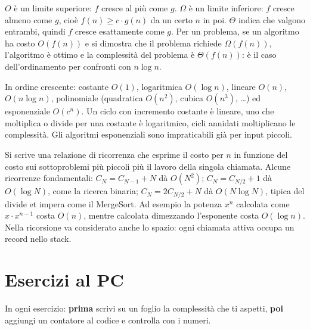 \begin{orale}
$O$ è un limite superiore: $f$ cresce al più come $g$. $\Omega$ è un limite inferiore:
$f$ cresce almeno come $g$, cioè $f(n) \ge c \cdot g(n)$ da un certo $n$ in poi.
$\Theta$ indica che valgono entrambi, quindi $f$ cresce esattamente come $g$. Per un
problema, se un algoritmo ha costo $O(f(n))$ e si dimostra che il problema richiede
$\Omega(f(n))$, l'algoritmo è ottimo e la complessità del problema è $\Theta(f(n))$:
è il caso dell'ordinamento per confronti con $n \log n$.
\end{orale}

\begin{orale}
In ordine crescente: costante $O(1)$, logaritmica $O(\log n)$, lineare $O(n)$,
$O(n \log n)$, polinomiale (quadratica $O(n^2)$, cubica $O(n^3)$, \ldots) ed
esponenziale $O(c^n)$. Un ciclo con incremento costante è lineare, uno che
moltiplica o divide per una costante è logaritmico, cicli annidati moltiplicano le
complessità. Gli algoritmi esponenziali sono impraticabili già per input piccoli.
\end{orale}

\begin{orale}
Si scrive una relazione di ricorrenza che esprime il costo per $n$ in funzione del
costo sui sottoproblemi più piccoli più il lavoro della singola chiamata. Alcune
ricorrenze fondamentali: $C_N = C_{N-1} + N$ dà $O(N^2)$; $C_N = C_{N/2} + 1$ dà
$O(\log N)$, come la ricerca binaria; $C_N = 2C_{N/2} + N$ dà $O(N \log N)$, tipica
del divide et impera come il MergeSort. Ad esempio la potenza $x^n$ calcolata come
$x \cdot x^{n-1}$ costa $O(n)$, mentre calcolata dimezzando l'esponente costa
$O(\log n)$. Nella ricorsione va considerato anche lo spazio: ogni chiamata attiva
occupa un record nello stack.
\end{orale}

\section{Esercizi al PC}

In ogni esercizio: \textbf{prima} scrivi su un foglio la complessità che ti
aspetti, \textbf{poi} aggiungi un contatore al codice e controlla con i numeri.

